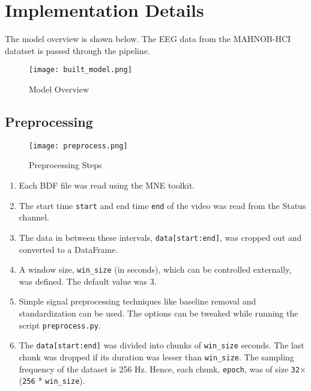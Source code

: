 
\chapter{Implementation Details} %

\label{Chapter5} %


The model overview is shown below. The EEG data from the MAHNOB-HCI datatset is passed through the pipeline.

\begin{figure}[H]
\centering
\texttt{[image: built\_model.png]}
\caption{Model Overview}
\label{fig-5-1}
\end{figure}

\section{Preprocessing}

\begin{figure}[H]
\hspace*{-0.7cm}
\texttt{[image: preprocess.png]}
\caption{Preprocessing Steps}
\label{fig-5-2}
\end{figure}

\begin{enumerate}
\item Each BDF file was read using the MNE toolkit.
\item The start time \texttt{start} and end time \texttt{end} of the video was read from the Status channel.
\item The data in between these intervals, \texttt{data[start:end]}, was cropped out and converted to a DataFrame.
\item A window size, \texttt{win\_size} (in seconds), which can be controlled externally, was defined. The default value was 3.
\item Simple signal preprocessing techniques like baseline removal and standardization can be used. The options can be tweaked while running the script \texttt{preprocess.py}.
\item The \texttt{data[start:end]} was divided into chunks of \texttt{win\_size} seconds. The last chunk was dropped if its duration was lesser than \texttt{win\_size}. The sampling frequency of the dataset is 256 Hz. Hence, each chunk, \texttt{epoch}, was of size \texttt{32}$ {\times}$ (\texttt{256} * \texttt{win\_size}).
\end{enumerate}

